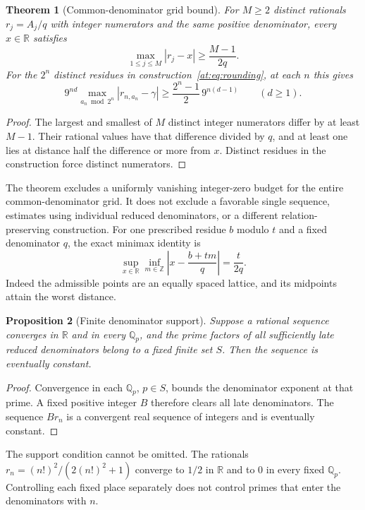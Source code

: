 \documentclass[11pt,a4paper]{article}
\newcommand{\Q}{\mathbb Q}
\newcommand{\R}{\mathbb R}
\newcommand{\Z}{\mathbb Z}
\newtheorem{theorem}{Theorem}[section]
\newtheorem{proposition}[theorem]{Proposition}
\theoremstyle{definition}
\theoremstyle{remark}
\numberwithin{equation}{section}
\begin{document}
\begin{theorem}[Common-denominator grid bound]
\label{at:grid:bound}
For $M\ge2$ distinct rationals $r_j=A_j/q$ with integer numerators and
the same positive denominator, every $x\in\R$ satisfies
\begin{equation}
 \max_{1\le j\le M}|r_j-x|\ge\frac{M-1}{2q}.
 \label{at:eq:grid-bound}
\end{equation}
For the $2^n$ distinct residues in construction~\eqref{at:eq:rounding},
at each $n$ this gives
\begin{equation}
 9^{nd}\max_{a_n\bmod2^n}|r_{n,a_n}-\gamma|
 \ge\frac{2^n-1}{2}\,9^{n(d-1)}\qquad(d\ge1).
\end{equation}
\end{theorem}
\begin{proof}
The largest and smallest of $M$ distinct integer numerators differ by
at least $M-1$. Their rational values have that difference divided by
$q$, and at least one lies at distance half the difference or more from
$x$. Distinct residues in the construction force distinct numerators.
\end{proof}

The theorem excludes a uniformly vanishing integer-zero budget for the
entire common-denominator grid. It does not exclude a favorable single
sequence, estimates using individual reduced denominators, or a different
relation-preserving construction. For one prescribed residue $b$ modulo
$t$ and a fixed denominator $q$, the exact minimax identity is
\[
 \sup_{x\in\R}\inf_{m\in\Z}
 \left|x-\frac{b+tm}{q}\right|=\frac{t}{2q}.
\]
Indeed the admissible points are an equally spaced lattice, and its
midpoints attain the worst distance.

\begin{proposition}[Finite denominator support]
\label{at:grid:finite-support}
Suppose a rational sequence converges in $\R$ and in every $\Q_p$,
and the prime factors of all sufficiently late reduced denominators
belong to a fixed finite set $S$. Then the sequence is eventually constant.
\end{proposition}
\begin{proof}
Convergence in each $\Q_p$, $p\in S$, bounds the denominator exponent
at that prime. A fixed positive integer $B$ therefore clears all late
denominators. The sequence $Br_n$ is a convergent real sequence of
integers and is eventually constant.
\end{proof}
The support condition cannot be omitted. The rationals
$r_n=(n!)^2/(2(n!)^2+1)$ converge to $1/2$ in $\R$ and to $0$ in
every fixed $\Q_p$. Controlling each fixed place separately does not
control primes that enter the denominators with $n$.
\end{document}
